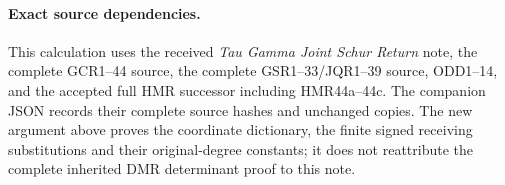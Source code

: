 \documentclass[11pt,a4paper]{article}
\begin{document}
\paragraph{Exact source dependencies.}
This calculation uses the received \emph{Tau Gamma Joint
Schur Return} note, the complete GCR1--44 source, the complete
GSR1--33/JQR1--39 source, ODD1--14, and the accepted full
HMR successor including HMR44a--44c. The companion JSON
records their complete source hashes and unchanged copies.
The new argument above proves the coordinate dictionary,
the finite signed receiving substitutions and their
original-degree constants; it does not reattribute the
complete inherited DMR determinant proof to this note.
\end{document}
